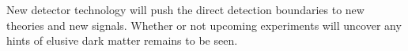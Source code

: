 New detector technology will push the direct detection boundaries to new theories and new signals. Whether or not upcoming experiments will uncover any hints of elusive dark matter remains to be seen.


